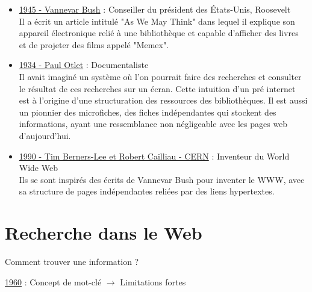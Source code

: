     \begin{itemize}
        \item \underline{1945 - Vannevar Bush} : Conseiller du président des États-Unis, Roosevelt\\ 
        Il a écrit un article intitulé "As We May Think" dans lequel il explique son appareil électronique relié à une bibliothèque et capable d'afficher des livres et de projeter des films appelé "Memex".
        \item \underline{1934 - Paul Otlet} : Documentaliste\\ 
        Il avait imaginé un système où l'on pourrait faire des recherches et consulter le résultat de ces recherches sur un écran. Cette intuition d'un pré internet est à l'origine d'une structuration des ressources des bibliothèques. Il est aussi un pionnier des microfiches, des fiches indépendantes qui stockent des informations, ayant une ressemblance non négligeable avec les pages web d'aujourd'hui.
        \item \underline{1990 - Tim Berners-Lee et  Robert Cailliau - CERN} : Inventeur du World Wide Web\\
        Ils se sont inspirés des écrits de Vannevar Bush pour inventer le WWW, avec sa structure de pages indépendantes reliées par des liens hypertextes.
    \end{itemize}
    
\vspace * {0.5cm}   


\chapter{Recherche dans le Web} %
Comment trouver une information ?
\vspace{0.3cm}

\underline{1960} : Concept de mot-clé $\rightarrow$ Limitations fortes

